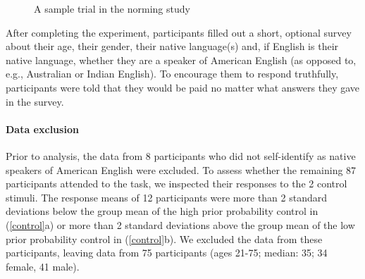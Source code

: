 \documentclass[11pt,fleqn]{article}
\newcommand{\6}{\mbox{$[\hspace*{-.6mm}[$}}
\newcommand{\9}{\mbox{$]\hspace*{-.6mm}]$}}
\begin{document}
\begin{figure}[H]
\begin{center}
\end{center}
\caption{A sample trial in the norming study}\label{f-trial-norming}
\end{figure}

After completing the experiment, participants filled out a short, optional survey about their age, their gender, their native language(s) and, if English is their native language, whether they are a speaker of American English (as opposed to, e.g., Australian or Indian English). To encourage them to respond truthfully, participants were told that they would be paid no matter what answers they gave in the survey.

\paragraph{Data exclusion} Prior to analysis, the data from 8 participants who did not self-identify as native speakers of American English were excluded. To assess whether the remaining 87 participants attended to the task, we inspected their responses to the 2 control stimuli. The response means of 12 participants were more than 2 standard deviations below the group mean of the high prior probability control in (\ref{control}a) or more than 2 standard deviations above the group mean of the low prior probability control in (\ref{control}b). We excluded the data from these participants, leaving data from 75 participants (ages 21-75; median: 35; 34 female, 41 male).
\end{document}
